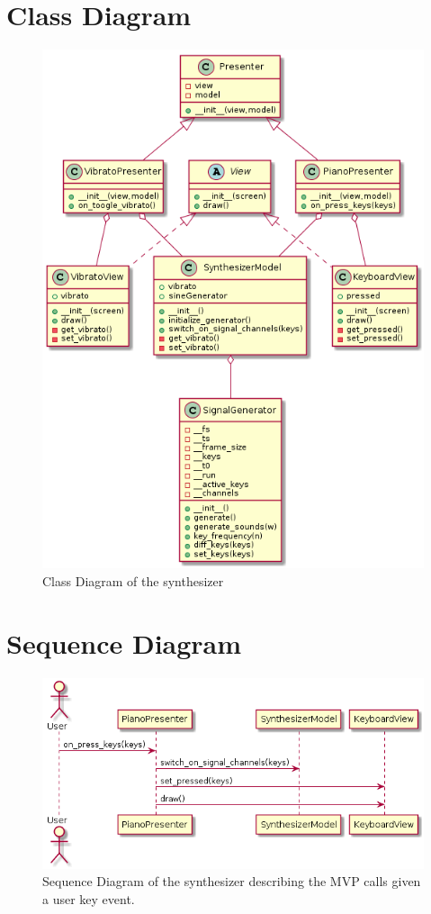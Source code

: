 \documentclass[margin,line,a4paper,authoryear,12pt]{report}
\begin{document}
\section{Class Diagram}
    \begin{figure}[h!]
        \centering
        \includegraphics[width=0.6\linewidth]{UML/ClassDiagram.png}
        \caption{Class Diagram of the synthesizer}
        \label{fig:ClassDiagram}
    \end{figure} 
\section{Sequence Diagram}
    \begin{figure}[h!]
        \centering
        \includegraphics[width=0.8\linewidth]{UML/SequenceDiagram.png}
        \caption{Sequence Diagram of the synthesizer describing the MVP calls given a user key event.}
        \label{fig:SequenceDiagram}
    \end{figure}
\end{document}
